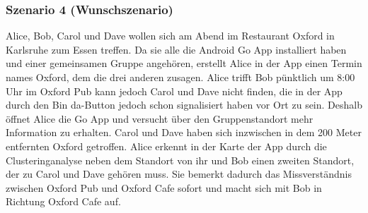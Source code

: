 \documentclass{scrartcl}
\begin{document}
	\subsubsection{Szenario 4 (Wunschszenario)}
	Alice, Bob, Carol und Dave wollen sich am Abend im Restaurant \glqq{}Oxford\grqq{} in Karlsruhe zum Essen treffen. 
	Da sie alle die Android Go App installiert haben und einer gemeinsamen Gruppe angehören, erstellt Alice in der App 		einen Termin names \glqq{}Oxford\grqq{}, dem die drei anderen zusagen. Alice trifft Bob pünktlich um 8:00 Uhr im 		\glqq{}Oxford Pub\grqq{} kann jedoch Carol und Dave nicht finden, die in der App durch den \glqq{}Bin da\grqq{}-Button 		jedoch schon signalisiert haben vor Ort zu sein. Deshalb öffnet Alice die Go App und versucht über den Gruppenstandort 		mehr Information zu erhalten. Carol und Dave haben sich inzwischen in dem 200 Meter entfernten \glqq{}Oxford 			\grqq{} getroffen. Alice erkennt in der Karte der App durch die Clusteringanalyse neben dem Standort von ihr und 		Bob einen zweiten Standort, der zu Carol und Dave gehören muss. Sie bemerkt dadurch das Missverständnis zwischen 		\glqq{}Oxford Pub\grqq{} und \glqq{}Oxford Cafe\grqq{} sofort und macht sich mit Bob in Richtung \glqq{}Oxford 			Cafe\grqq{} auf.    
	
	
	
	
	
	
	
	
	\newpage
	
\end{document}
